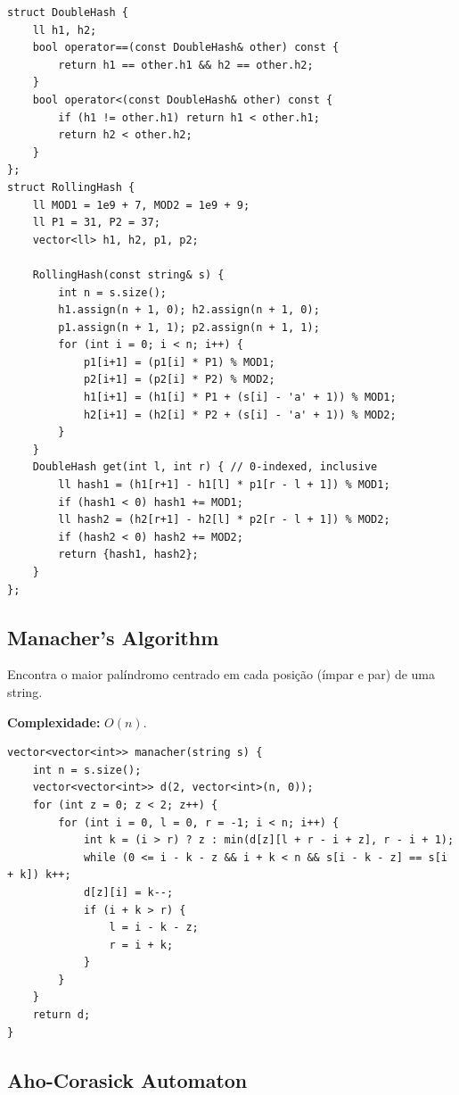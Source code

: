 \begin{lstlisting}
struct DoubleHash {
    ll h1, h2;
    bool operator==(const DoubleHash& other) const {
        return h1 == other.h1 && h2 == other.h2;
    }
    bool operator<(const DoubleHash& other) const {
        if (h1 != other.h1) return h1 < other.h1;
        return h2 < other.h2;
    }
};
struct RollingHash {
    ll MOD1 = 1e9 + 7, MOD2 = 1e9 + 9;
    ll P1 = 31, P2 = 37;
    vector<ll> h1, h2, p1, p2;
    
    RollingHash(const string& s) {
        int n = s.size();
        h1.assign(n + 1, 0); h2.assign(n + 1, 0);
        p1.assign(n + 1, 1); p2.assign(n + 1, 1);
        for (int i = 0; i < n; i++) {
            p1[i+1] = (p1[i] * P1) % MOD1;
            p2[i+1] = (p2[i] * P2) % MOD2;
            h1[i+1] = (h1[i] * P1 + (s[i] - 'a' + 1)) % MOD1;
            h2[i+1] = (h2[i] * P2 + (s[i] - 'a' + 1)) % MOD2;
        }
    }
    DoubleHash get(int l, int r) { // 0-indexed, inclusive
        ll hash1 = (h1[r+1] - h1[l] * p1[r - l + 1]) % MOD1;
        if (hash1 < 0) hash1 += MOD1;
        ll hash2 = (h2[r+1] - h2[l] * p2[r - l + 1]) % MOD2;
        if (hash2 < 0) hash2 += MOD2;
        return {hash1, hash2};
    }
};
\end{lstlisting}


\subsection{Manacher's Algorithm}

Encontra o maior palíndromo centrado em cada posição (ímpar e par) de uma string.

\textbf{Complexidade:} $O(n)$.

\begin{lstlisting}
vector<vector<int>> manacher(string s) {
    int n = s.size();
    vector<vector<int>> d(2, vector<int>(n, 0));
    for (int z = 0; z < 2; z++) {
        for (int i = 0, l = 0, r = -1; i < n; i++) {
            int k = (i > r) ? z : min(d[z][l + r - i + z], r - i + 1);
            while (0 <= i - k - z && i + k < n && s[i - k - z] == s[i + k]) k++;
            d[z][i] = k--;
            if (i + k > r) {
                l = i - k - z;
                r = i + k;
            }
        }
    }
    return d;
}
\end{lstlisting}


\subsection{Aho-Corasick Automaton}


